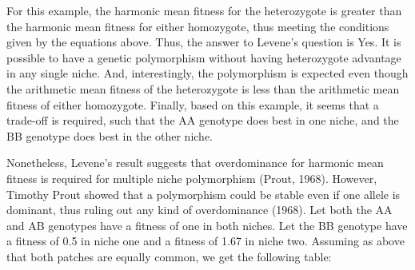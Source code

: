 \documentclass[
  letterpaper,
]{book}
\begin{document}
\begin{tcolorbox}
For this example, the harmonic mean fitness for the heterozygote is
greater than the harmonic mean fitness for either homozygote, thus
meeting the conditions given by the equations above. Thus, the answer to
Levene's question is Yes. It is possible to have a genetic polymorphism
without having heterozygote advantage in any single niche. And,
interestingly, the polymorphism is expected even though the arithmetic
mean fitness of the heterozygote is less than the arithmetic mean
fitness of either homozygote. Finally, based on this example, it seems
that a trade-off is required, such that the AA genotype does best in one
niche, and the BB genotype does best in the other niche.

Nonetheless, Levene's result suggests that overdominance for harmonic
mean fitness is required for multiple niche polymorphism (Prout, 1968).
However, Timothy Prout showed that a polymorphism could be stable even
if one allele is dominant, thus ruling out any kind of overdominance
(1968). Let both the AA and AB genotypes have a fitness of one in both
niches. Let the BB genotype have a fitness of 0.5 in niche one and a
fitness of 1.67 in niche two. Assuming as above that both patches are
equally common, we get the following table:


\end{tcolorbox}
\end{document}
